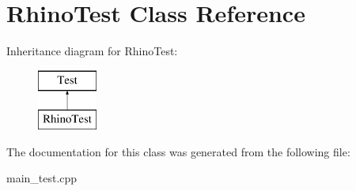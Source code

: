\hypertarget{class_rhino_test}{}\section{Rhino\+Test Class Reference}
\label{class_rhino_test}
Inheritance diagram for Rhino\+Test\+:\begin{figure}[H]
\begin{center}
\leavevmode
\includegraphics[height=2.000000cm]{class_rhino_test}
\end{center}
\end{figure}


The documentation for this class was generated from the following file\+:\begin{DoxyCompactItemize}
\item 
main\+\_\+test.\+cpp\end{DoxyCompactItemize}
